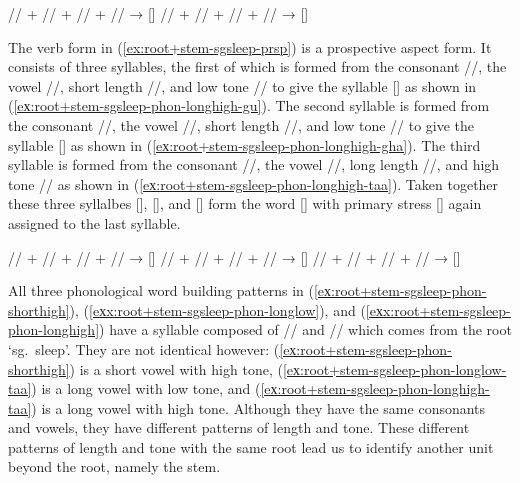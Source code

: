 \pex\label{eхx:root+stem-sgsleep-phon-longlow}%
\a\label{eх:root+stem-sgsleep-phon-longlow-woo}%
%
	// + // + // + //
	→ []
\a\label{eх:root+stem-sgsleep-phon-longlow-taa}%
%
	// + // + // + //
	→ []
\xe

The verb form in (\ref{ex:root+stem-sgsleep-prsp}) is a prospective aspect form.
It consists of three syllables, the first of which is formed from the consonant //, the vowel //, short length //, and low tone // to give the syllable [] as shown in (\ref{eх:root+stem-sgsleep-phon-longhigh-gu}).
The second syllable is formed from the consonant //, the vowel //, short length //, and low tone // to give the syllable [] as shown in (\ref{eх:root+stem-sgsleep-phon-longhigh-gha}).
The third syllable is formed from the consonant //, the vowel //, long length //, and high tone // as shown in (\ref{eх:root+stem-sgsleep-phon-longhigh-taa}).
Taken together these three syllalbes [], [], and [] form the word [] with primary stress [] again assigned to the last syllable.

\pex\label{eхx:root+stem-sgsleep-phon-longhigh}%
\a\label{eх:root+stem-sgsleep-phon-longhigh-gu}%
%
	// + // + // + //
	→ []
\a\label{eх:root+stem-sgsleep-phon-longhigh-gha}%
%
	// + // + // + //
	→ []
\a\label{eх:root+stem-sgsleep-phon-longhigh-taa}%
%
	// + // + // + //
	→ []
\xe

All three phonological word building patterns in (\ref{eх:root+stem-sgsleep-phon-shorthigh}), (\ref{eхx:root+stem-sgsleep-phon-longlow}), and (\ref{eхx:root+stem-sgsleep-phon-longhigh}) have a syllable composed of // and // which comes from the root  ‘sg.\ sleep’.
They are not identical however: (\ref{eх:root+stem-sgsleep-phon-shorthigh}) is a short vowel with high tone, (\ref{eх:root+stem-sgsleep-phon-longlow-taa}) is a long vowel with low tone, and (\ref{eх:root+stem-sgsleep-phon-longhigh-taa}) is a long vowel with high tone.
Although they have the same consonants and vowels, they have different patterns of length and tone.
These different patterns of length and tone with the same root lead us to identify another unit beyond the root, namely the stem.


